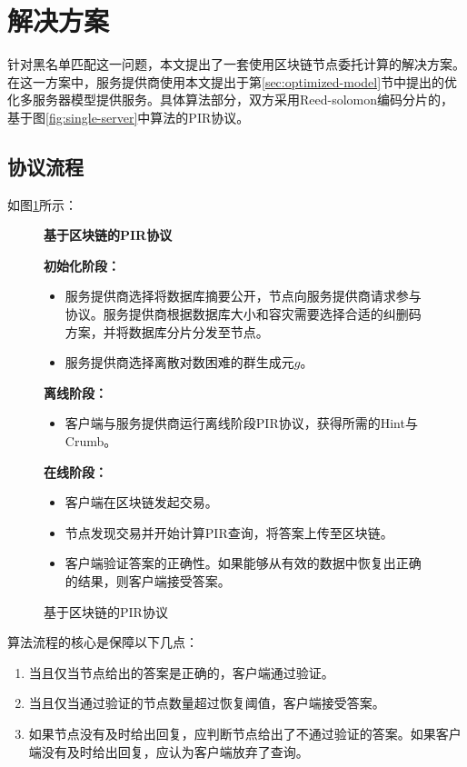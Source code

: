 \section{解决方案}
针对黑名单匹配这一问题，本文提出了一套使用区块链节点委托计算的解决方案。在这一方案中，服务提供商使用本文提出于第\ref{sec:optimized-model}节中提出的优化多服务器模型提供服务。具体算法部分，双方采用Reed-solomon编码分片的，基于图\ref{fig:single-server}中算法的PIR协议。
\subsection{协议流程}
如图\ref{fig:blockchain-scheme}所示：
\begin{figure}
    \begin{mdframed}
        \centering
        \textbf{基于区块链的PIR协议}

        \raggedright
        \textbf{初始化阶段：}
        \begin{itemize}
            \item 服务提供商选择将数据库摘要公开，节点向服务提供商请求参与协议。服务提供商根据数据库大小和容灾需要选择合适的纠删码方案，并将数据库分片分发至节点。
            \item 服务提供商选择离散对数困难的群生成元$g$。
        \end{itemize}
        \textbf{离线阶段：}
        \begin{itemize}
            \item 客户端与服务提供商运行离线阶段PIR协议，获得所需的Hint与Crumb。
        \end{itemize}
        \textbf{在线阶段：}
        \begin{itemize}
            \item 客户端在区块链发起交易。
            \item 节点发现交易并开始计算PIR查询，将答案上传至区块链。
            \item 客户端验证答案的正确性。如果能够从有效的数据中恢复出正确的结果，则客户端接受答案。
        \end{itemize}
    \end{mdframed}
    \caption{基于区块链的PIR协议}
    \label{fig:blockchain-scheme}
\end{figure}

算法流程的核心是保障以下几点：
\begin{enumerate}
    \item 当且仅当节点给出的答案是正确的，客户端通过验证。
    \item 当且仅当通过验证的节点数量超过恢复阈值，客户端接受答案。
    \item 如果节点没有及时给出回复，应判断节点给出了不通过验证的答案。如果客户端没有及时给出回复，应认为客户端放弃了查询。
\end{enumerate}

